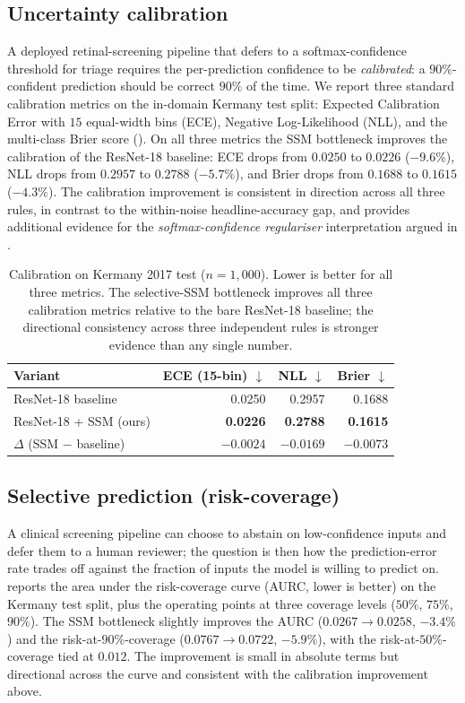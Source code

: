 \documentclass[5p]{elsarticle}
\begin{document}
\subsection{Uncertainty calibration}
\label{sec:calibration}
A deployed retinal-screening pipeline that defers to a softmax-confidence threshold for triage requires the per-prediction confidence to be \emph{calibrated}: a $90\%$-confident prediction should be correct $90\%$ of the time. We report three standard calibration metrics on the in-domain Kermany test split: Expected Calibration Error with $15$ equal-width bins (ECE), Negative Log-Likelihood (NLL), and the multi-class Brier score (). On all three metrics the SSM bottleneck improves the calibration of the ResNet-18 baseline: ECE drops from $0.0250$ to $0.0226$ ($-9.6\%$), NLL drops from $0.2957$ to $0.2788$ ($-5.7\%$), and Brier drops from $0.1688$ to $0.1615$ ($-4.3\%$). The calibration improvement is consistent in direction across all three rules, in contrast to the within-noise headline-accuracy gap, and provides additional evidence for the \emph{softmax-confidence regulariser} interpretation argued in .

\begin{table}[t]
\centering\small
\caption{Calibration on Kermany 2017 test ($n=1{,}000$). Lower is better for all three metrics. The selective-SSM bottleneck improves all three calibration metrics relative to the bare ResNet-18 baseline; the directional consistency across three independent rules is stronger evidence than any single number.}
\label{tab:cal}
\setlength{\tabcolsep}{6pt}
\begin{tabular}{l rrr}
\toprule
Variant & ECE (15-bin) $\downarrow$ & NLL $\downarrow$ & Brier $\downarrow$ \\
\midrule
ResNet-18 baseline       & 0.0250 & 0.2957 & 0.1688 \\
ResNet-18 + SSM (ours)   & \textbf{0.0226} & \textbf{0.2788} & \textbf{0.1615} \\
$\Delta$ (SSM $-$ baseline) & $\mathbf{-0.0024}$ & $\mathbf{-0.0169}$ & $\mathbf{-0.0073}$ \\
\bottomrule
\end{tabular}
\end{table}

\subsection{Selective prediction (risk-coverage)}
\label{sec:selective}
A clinical screening pipeline can choose to abstain on low-confidence inputs and defer them to a human reviewer; the question is then how the prediction-error rate trades off against the fraction of inputs the model is willing to predict on.  reports the area under the risk-coverage curve (AURC, lower is better) on the Kermany test split, plus the operating points at three coverage levels ($50\%$, $75\%$, $90\%$). The SSM bottleneck slightly improves the AURC ($0.0267\rightarrow 0.0258$, $-3.4\%$) and the risk-at-$90\%$-coverage ($0.0767\rightarrow 0.0722$, $-5.9\%$), with the risk-at-$50\%$-coverage tied at $0.012$. The improvement is small in absolute terms but directional across the curve and consistent with the calibration improvement above.
\end{document}
